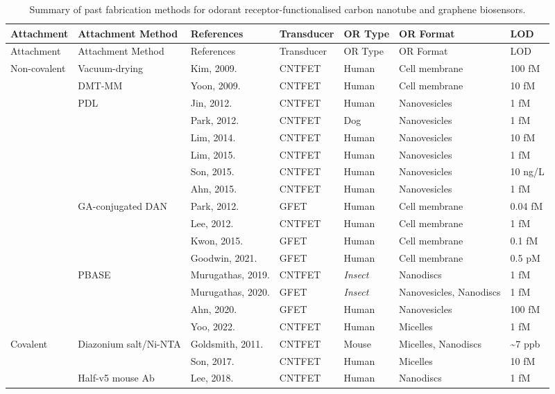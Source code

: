 \documentclass[
  a4paper,
]{scrbook}
\begin{document}
\hypertarget{tbl-or-biosensors}{}
\begin{longtable}[]{@{}lllllll@{}}
\caption{\label{tbl-or-biosensors}Summary of past fabrication methods
for odorant receptor-functionalised carbon nanotube and graphene
biosensors.}\tabularnewline
\toprule\noalign{}
Attachment & Attachment Method & References & Transducer & OR Type & OR
Format & LOD \\
\midrule\noalign{}
\endfirsthead
\toprule\noalign{}
Attachment & Attachment Method & References & Transducer & OR Type & OR
Format & LOD \\
\midrule\noalign{}
\endhead
\bottomrule\noalign{}
\endlastfoot
Non-covalent & Vacuum-drying & Kim, 2009. \cite{Kim2009a} & CNTFET &
Human & Cell membrane & 100 fM \\
& DMT-MM & Yoon, 2009. \cite{Yoon2009} & CNTFET & Human & Cell membrane
& 10 fM \\
& PDL & Jin, 2012. \cite{Jin2012} & CNTFET & Human & Nanovesicles & 1
fM \\
& & Park, 2012. \cite{Park2012a} & CNTFET & Dog & Nanovesicles & 1 fM \\
& & Lim, 2014. \cite{Lim2014} & CNTFET & Human & Nanovesicles & 10 fM \\
& & Lim, 2015. \cite{Lim2015} & CNTFET & Human & Nanovesicles & 1 fM \\
& & Son, 2015. \cite{Son2015} & CNTFET & Human & Nanovesicles & 10
ng/L \\
& & Ahn, 2015. \cite{Ahn2015} & CNTFET & Human & Nanovesicles & 1 fM \\
& GA-conjugated DAN & Park, 2012. \cite{Park2012} & GFET & Human & Cell
membrane & 0.04 fM \\
& & Lee, 2012. \cite{Lee2012b} & CNTFET & Human & Cell membrane & 1
fM \\
& & Kwon, 2015. \cite{Kwon2015} & GFET & Human & Cell membrane & 0.1
fM \\
& & Goodwin, 2021. \cite{Goodwin2021} & GFET & Human & Cell membrane &
0.5 pM \\
& PBASE & Murugathas, 2019. \cite{Murugathas2019a} & CNTFET &
\textit{Insect} & Nanodiscs & 1 fM \\
& & Murugathas, 2020. \cite{Murugathas2020} & GFET & \textit{Insect} &
Nanovesicles, Nanodiscs & 1 fM \\
& & Ahn, 2020. \cite{Ahn2020} & GFET & Human & Nanovesicles & 100 fM \\
& & Yoo, 2022. \cite{Yoo2022} & CNTFET & Human & Micelles & 1 fM \\
Covalent & Diazonium salt/Ni-NTA & Goldsmith, 2011. \cite{Goldsmith2011}
& CNTFET & Mouse & Micelles, Nanodiscs & \textasciitilde7 ppb \\
& & Son, 2017. \cite{Son2017} & CNTFET & Human & Micelles & 10 fM \\
& Half-v5 mouse Ab & Lee, 2018. \cite{Lee2018} & CNTFET & Human &
Nanodiscs & 1 fM \\
\end{longtable}
\end{document}

